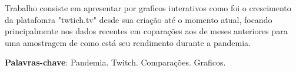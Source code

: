 
\setlength{\absparsep}{18pt} %
\begin{resumo}
Trabalho consiste em apresentar por graficos interativos como foi o crescimento da platafomra "twtich.tv" desde sua criação até o momento atual, focando principalmente nos dados recentes em coparações aos de meses anteriores para uma amostragem de como está seu rendimento durante a pandemia.

 \vspace{\onelineskip}
 \noindent
 \textbf{Palavras-chave}: Pandemia. Twitch. Comparações. Graficos.

\end{resumo}



